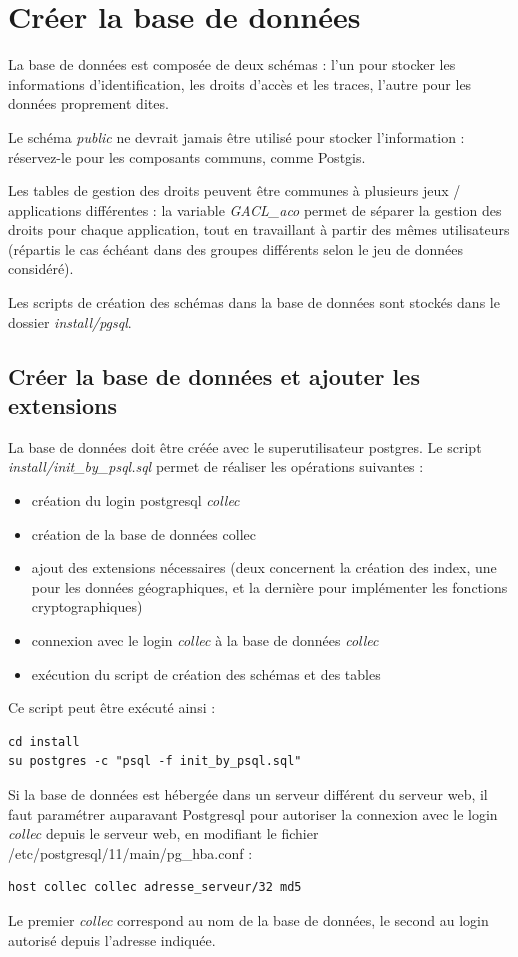\section{Créer la base de données}

La base de données est composée de deux schémas : l'un pour stocker les informations d'identification, les droits d'accès et les traces, l'autre pour les données proprement dites.

Le schéma \textit{public} ne devrait jamais être utilisé pour stocker l'information : réservez-le pour les composants communs, comme Postgis.

Les tables de gestion des droits peuvent être communes à plusieurs jeux / applications différentes : la variable \textit{GACL\_aco} permet de séparer la gestion des droits pour chaque application, tout en travaillant à partir des mêmes utilisateurs (répartis le cas échéant dans des groupes différents selon le jeu de données considéré).

Les scripts de création des schémas dans la base de données sont stockés dans le dossier \textit{install/pgsql}. 

\subsection{Créer la base de données et ajouter les extensions}
La base de données doit être créée avec le superutilisateur postgres. Le script \textit{install/init\_by\_psql.sql} permet de réaliser les opérations suivantes :
\begin{itemize}
	\item création du login postgresql \textit{collec}
	\item création de la base de données collec
	\item ajout des extensions nécessaires (deux concernent la création des index, une pour les données géographiques, et la dernière pour implémenter les fonctions cryptographiques)
	\item connexion avec le login \textit{collec} à la base de données \textit{collec}
	\item exécution du script de création des schémas et des tables
\end{itemize}

Ce script peut être exécuté ainsi :
\begin{lstlisting}
cd install
su postgres -c "psql -f init_by_psql.sql"
\end{lstlisting}

Si la base de données est hébergée dans un serveur différent du serveur web, il faut paramétrer auparavant Postgresql pour autoriser la connexion avec le login \textit{collec} depuis le serveur web, en modifiant le fichier /etc/postgresql/11/main/pg\_hba.conf :
\begin{lstlisting}
host collec collec adresse_serveur/32 md5 
\end{lstlisting}
Le premier \textit{collec} correspond au nom de la base de données, le second au login autorisé depuis l'adresse indiquée.


